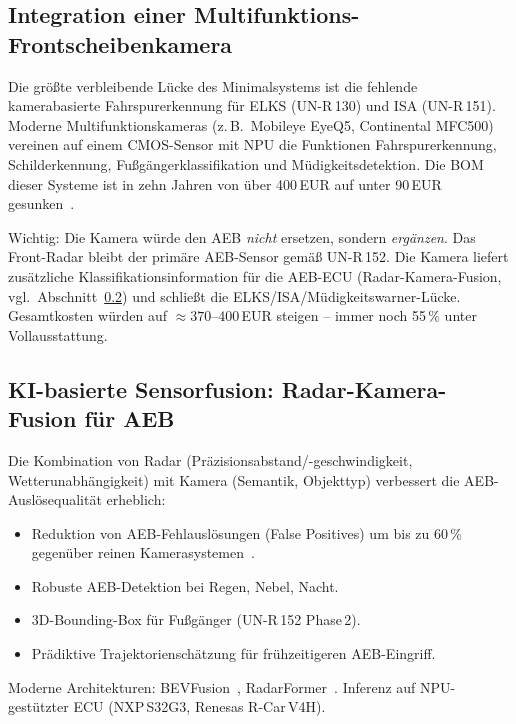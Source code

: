﻿\documentclass[a4paper,12pt]{article}
\theoremstyle{definition}
\begin{document}
\subsection{Integration einer Multifunktions-Frontscheibenkamera}

Die gr\"o\ss{}te verbleibende L\"ucke des Minimalsystems ist die fehlende
kamerabasierte Fahrspurerkennung f\"ur ELKS (UN-R\,130) und ISA
(UN-R\,151). Moderne Multifunktionskameras (z.\,B.\ Mobileye EyeQ5,
Continental MFC500) vereinen auf einem CMOS-Sensor mit NPU die Funktionen
Fahrspurerkennung, Schilderkennung, Fu\ss{}g\"angerklassifikation und
M\"udigkeitsdetektion. Die BOM dieser Systeme ist in zehn Jahren von
\"uber 400\,EUR auf unter 90\,EUR gesunken~\cite{mobileye2023eyeq5}.

Wichtig: Die Kamera w\"urde den AEB \emph{nicht} ersetzen, sondern
\emph{erg\"anzen}. Das Front-Radar bleibt der prim\"are AEB-Sensor
gem\"a\ss{} UN-R\,152. Die Kamera liefert zus\"atzliche
Klassifikationsinformation f\"ur die AEB-ECU (Radar-Kamera-Fusion,
vgl.\ Abschnitt~\ref{subsec:ki_fusion}) und schlie\ss{}t die
ELKS/ISA/M\"udigkeitswarner-L\"ucke. Gesamtkosten w\"urden auf
$\approx370$--$400$\,EUR steigen -- immer noch 55\,\% unter Vollausstattung.

\subsection{KI-basierte Sensorfusion: Radar-Kamera-Fusion f\"ur AEB}
\label{subsec:ki_fusion}

Die Kombination von Radar (Pr\"azisionsabstand/-geschwindigkeit,
Wetterunabh\"angigkeit) mit Kamera (Semantik, Objekttyp) verbessert
die AEB-Ausl\"osequalit\"at erheblich:

\begin{itemize}
  \item Reduktion von AEB-Fehlausl\"osungen (False Positives) um bis zu
        60\,\% gegen\"uber reinen Kamerasystemen~\cite{euroancap2023aeb}.
  \item Robuste AEB-Detektion bei Regen, Nebel, Nacht.
  \item 3D-Bounding-Box f\"ur Fu\ss{}g\"anger (UN-R\,152 Phase\,2).
  \item Pr\"adiktive Trajektoriensch\"atzung f\"ur fr\"uhzeitigeren
        AEB-Eingriff.
\end{itemize}

Moderne Architekturen: BEVFusion~\cite{liu2023bevfusion},
RadarFormer~\cite{zhou2024radarformer}. Inferenz auf NPU-gest\"utzter
ECU (NXP\,S32G3, Renesas R-Car\,V4H).
\end{document}
